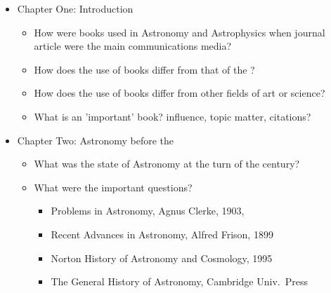 

\begin{itemize}
\item Chapter One: Introduction
  \begin{itemize}
  \item How were books used in Astronomy and Astrophysics when journal article
    were the main communications media?
  \item How does the use of books differ from that of the ?
  \item How does the use of books differ from other fields of art or science?
  \item What is an 'important' book? influence, topic matter, citations?
  \end{itemize}
  
\item Chapter Two: Astronomy before the 
  \begin{itemize}
  \item What was the state of Astronomy at the turn of the century?
  \item What were the important questions?
    \begin{itemize}
    \item Problems in Astronomy, Agnus Clerke, 1903, \cite{clerke:1903}
    \item Recent Advances in Astronomy, Alfred Frison, 1899 \cite{frison:1899}
    \item Norton History of Astronomy and Cosmology, 1995
    \item The General History of Astronomy, Cambridge Univ.\ Press
    \end{itemize}
  \end{itemize}
  

\end{itemize}
